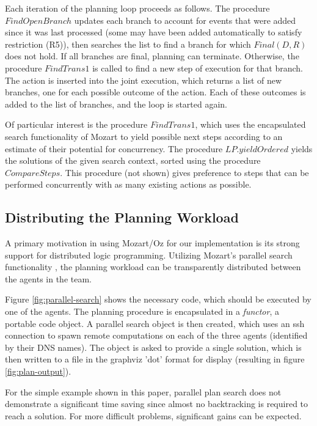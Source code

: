 Each iteration of the planning loop proceeds as follows. The procedure
$FindOpenBranch$ updates each branch to account for events that were
added since it was last processed (some may have been added automatically
to satisfy restriction (R5)), then searches the list to find a branch
for which $Final(D,R)$ does not hold. If all branches are final,
planning can terminate. Otherwise, the procedure $FindTrans1$ is
called to find a new step of execution for that branch. The action
is inserted into the joint execution, which returns a list of new
branches, one for each possible outcome of the action. Each of these
outcomes is added to the list of branches, and the loop is started
again.

Of particular interest is the procedure $FindTrans1$, which uses
the encapsulated search functionality of Mozart to yield possible
next steps according to an estimate of their potential for concurrency.
The procedure $LP.yieldOrdered$ yields the solutions of the given
search context, sorted using the procedure $CompareSteps$. This procedure
(not shown) gives preference to steps that can be performed concurrently
with as many existing actions as possible.


\subsection{Distributing the Planning Workload}

A primary motivation in using Mozart/Oz for our implementation is
its strong support for distributed logic programming. Utilizing Mozart's
parallel search functionality \citep{Schulte00constraint_services},
the planning workload can be transparently distributed between the
agents in the team.

Figure \ref{fig:parallel-search} shows the necessary code, which
should be executed by one of the agents. The planning procedure is
encapsulated in a \emph{functor}, a portable code object. A parallel
search object is then created, which uses an ssh connection to spawn
remote computations on each of the three agents (identified by their
DNS names). The object is asked to provide a single solution, which
is then written to a file in the graphviz 'dot' format for display
(resulting in figure \ref{fig:plan-output}).

For the simple example shown in this paper, parallel plan search does
not demonstrate a significant time saving since almost no backtracking
is required to reach a solution. For more difficult problems, significant
gains can be expected.


